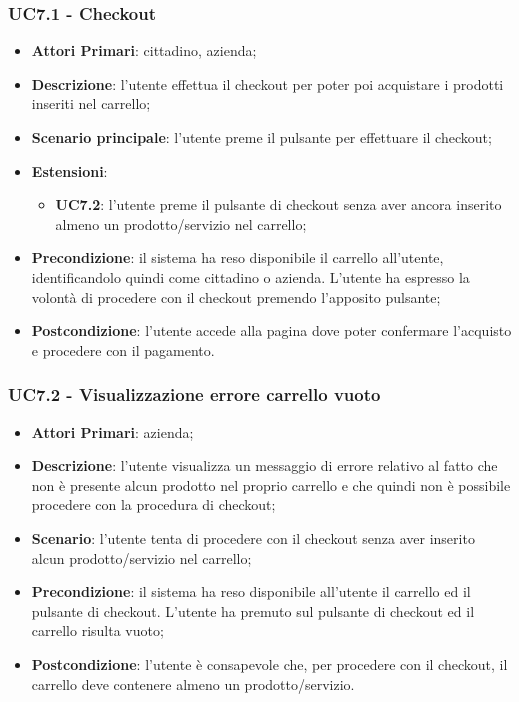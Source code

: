 \subsubsection{UC7.1 - Checkout}
\begin{itemize}
	\item \textbf{Attori Primari}: cittadino, azienda;
	\item \textbf{Descrizione}: l'utente effettua il checkout per poter poi acquistare i prodotti inseriti nel carrello;
	\item \textbf{Scenario principale}: l'utente preme il pulsante per effettuare il checkout;
	\item \textbf{Estensioni}: 
	\begin{itemize}
		\item \textbf{UC7.2}: l'utente preme il pulsante di checkout senza aver ancora inserito almeno un prodotto/servizio nel carrello;
	\end{itemize}
	\item \textbf{Precondizione}: il sistema ha reso disponibile il carrello all'utente, identificandolo quindi come cittadino o azienda. L'utente ha espresso la volontà di procedere con il checkout premendo l'apposito pulsante;
	\item \textbf{Postcondizione}: l'utente accede alla pagina dove poter confermare l'acquisto e procedere con il pagamento.
\end{itemize}

\subsubsection{UC7.2 - Visualizzazione errore carrello vuoto}
\begin{itemize}
	\item \textbf{Attori Primari}: azienda;
	\item \textbf{Descrizione}:
	l'utente visualizza un messaggio di errore relativo al fatto che non è presente alcun prodotto nel proprio carrello e che quindi non è possibile procedere con la procedura di checkout;
	\item \textbf{Scenario}: l'utente tenta di procedere con il checkout senza aver inserito alcun prodotto/servizio nel carrello;
	\item \textbf{Precondizione}: il sistema ha reso disponibile all'utente il carrello ed il pulsante di checkout. L'utente ha premuto sul pulsante di checkout ed il carrello risulta vuoto; 
	\item \textbf{Postcondizione}:
	l'utente è consapevole che, per procedere con il checkout, il carrello deve contenere almeno un prodotto/servizio. 
\end{itemize}

